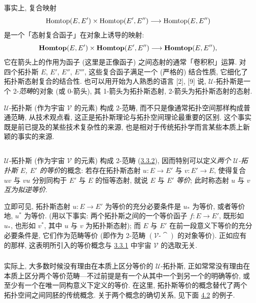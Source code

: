 \subsubsection{}
事实上, 复合映射
$$
\operatorname{Homtop}(E, E')\times \operatorname{Homtop}(E',E'')\longrightarrow \operatorname{Homtop}(E,E'')
$$
是一个「态射复合函子」在对象上诱导的映射:
$$
\operatorname{\mathbf{Homtop}}(E,E')\times \operatorname{\mathbf{Homtop}}(E',E'')\longrightarrow
\operatorname{\mathbf{Homtop}}(E,E''){},
$$
它在箭头上的\pageoriginale 作用为函子 (这里是正像函子) 之间态射的通常「卷积积」运算. 对四个拓扑斯 $E$, $E'$, $E''$, $E'''$, 这些复合函子满足一个 (严格的) 结合性质, 它细化了拓扑斯态射复合的结合性. 也可以用开始为人熟悉的语言 [2], [9] 说, $𝒰$-拓扑斯是一个 2-\emph{范畴}的对象 (或 0-箭头), 其 1-箭头为拓扑斯态射, 2-箭头为拓扑斯态射的态射.

$𝒰$-拓扑斯 (作为宇宙 $𝒱$ 的元素) 构成 2-范畴, 而不只是像通常拓扑空间那样构成普通范畴, 从技术观点看, 这正是拓扑斯理论与拓扑空间理论最重要的区别. 这个事实既是前已提及的某些技术复杂性的来源, 也是相对于传统拓扑学而言某些本质上新颖的事实的来源.

\subsection{}
$𝒰$-拓扑斯 (作为宇宙 $𝒱$ 的元素) 构成 2-范畴 (\hyperref[IV.subsubsec3.3.2]{3.3.2}), 因而特别可以定义\emph{两个 $𝒰$-拓扑斯 $E$, $E'$ 的等价}的概念: 若存在拓扑斯态射 $u:E\rightarrow E'$ 与 $v:E'\rightarrow E$, 使得复合 $uv$ 与 $vu$ 分别同构于 $E'$ 与 $E$ 的恒等态射, 就说 $E$ 与 $E'$ \emph{等价}; 此时称态射 $u$ 与 $v$ \pageoriginale \emph{互为拟逆等价}.

立即可见, 拓扑斯态射 $u:E\rightarrow E'$ 为等价的充分必要条件是 $u_{\ast}$ 为等价, 或者等价地, $u^{\ast}$ 为等价. (用以下事实: 两个拓扑斯之间的一个等价函子 $f:E\rightarrow E'$, 既形如 $u_{\ast}$, 也形如 $v^{\ast}$, 其中 $u$ 与 $v$ 为拓扑斯态射); 而 $E$ 与 $E'$ 在前一段意义下等价的充分必要条件是, 它们作为范畴等价 (即作为 2-范畴 $(𝒱\text{-}\cat)$ 的对象等价). 正如应有的那样, 这表明所引入的等价概念与 \hyperref[IV.subsubsec3.3.1]{3.3.1} 中宇宙 $𝒱$ 的选取无关.

\subsubsection{}
实际上, 大多数时候没有理由在本质上区分等价的 $𝒰$-拓扑斯, 正如常常没有理由在本质上区分两个等价范畴---不过前提是有一个从其中一个到另一个的明确等价, 或至少有一个在唯一同构意义下定义的等价. 在这里, 拓扑斯等价的概念替代了两个拓扑空间之间同胚的传统概念. 关于两个概念的确切关系, 见下面 \hyperref[IV.subsec4.2]{4.2} 的例子.

